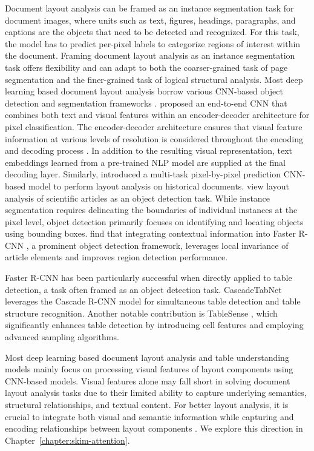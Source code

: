 Document layout analysis can be framed as an instance segmentation task for document images, where units such as text, figures, headings, paragraphs, and captions are the objects that need to be detected and recognized. For this task, the model has to predict per-pixel labels to categorize regions of interest within the document. Framing document layout analysis as an instance segmentation task offers flexibility and can adapt to both the coarser-grained task of page segmentation and the finer-grained task of logical structural analysis. Most deep learning based document layout analysis borrow various \ac{CNN}-based object detection and segmentation frameworks \citet{ren2015faster, cai2018cascade}. \citet{yang2017learning} proposed an end-to-end \ac{CNN} that combines both text and visual features within an encoder-decoder architecture for pixel classification. The encoder-decoder architecture ensures that visual feature information at various levels of resolution is considered throughout the encoding and decoding process \citep{burt1987laplacian}. In addition to the resulting visual representation, text embeddings learned from a pre-trained \ac{NLP} model are supplied at the final decoding layer. Similarly, \citet{oliveira2018dhsegment} introduced a multi-task pixel-by-pixel prediction \ac{CNN}-based model to perform layout analysis on historical documents. \citet{soto2019visual} view layout analysis of scientific articles as an object detection task. While instance segmentation requires delineating the boundaries of individual instances at the pixel level, object detection primarily focuses on identifying and locating objects using bounding boxes. \citet{soto2019visual} find that integrating contextual information into Faster R-CNN \citep{ren2015faster}, a prominent object detection framework, leverages local invariance of article elements and improves region detection performance. 

Faster R-CNN has been particularly successful when directly applied to table detection, a task often framed as an object detection task. CascadeTabNet \citep{prasad2020cascadetabnet} leverages the Cascade R-CNN \citep{cai2018cascade} model for simultaneous table detection and table structure recognition. Another notable contribution is TableSense \citep{dong2019tablesense}, which significantly enhances table detection by introducing cell features and employing advanced sampling algorithms. 

Most deep learning based document layout analysis and table understanding models mainly focus on processing visual features of layout components using \ac{CNN}-based models. Visual features alone may fall short in solving document layout analysis tasks due to their limited ability to capture underlying semantics, structural relationships, and textual content. For better layout analysis, it is crucial to integrate both visual and semantic information while capturing and encoding relationships between layout components \citep{luo2022doc}. We explore this direction in Chapter~\ref{chapter:skim-attention}.


